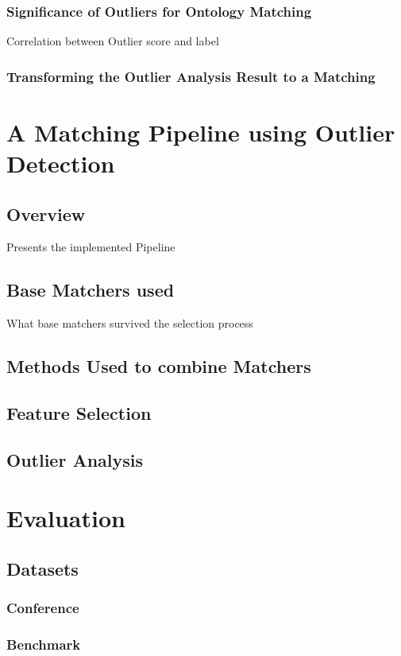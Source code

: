 \documentclass[11pt,titlepage,oneside,openany,a4paper]{report}
\begin{document}
\subsection{Significance of Outliers for Ontology Matching}
Correlation between Outlier score and label
\subsection{Transforming the Outlier Analysis Result to a Matching}


\chapter{A Matching Pipeline using Outlier Detection}

\section{Overview}
Presents the implemented Pipeline
\section{Base Matchers used}
What base matchers survived the selection process
\section{Methods Used to combine Matchers}

\section{Feature Selection}

\section{Outlier Analysis}



\chapter{Evaluation}
\section{Datasets}
\subsection{Conference}
\subsection{Benchmark}
\end{document}
